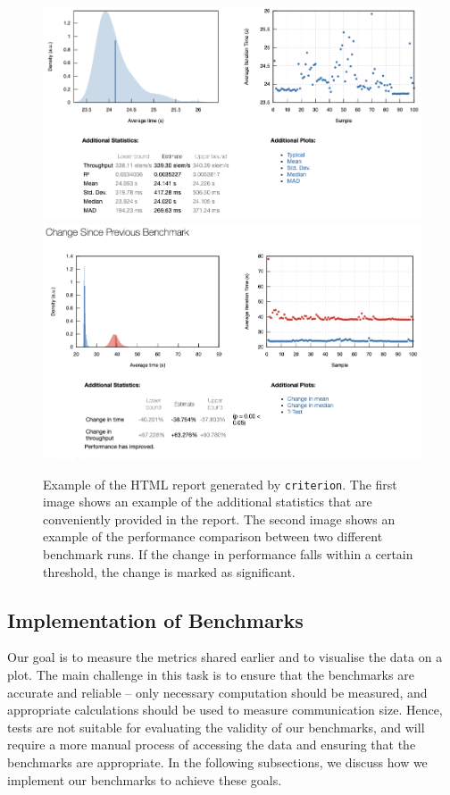 \begin{figure}
  \centering
  \includegraphics[width=0.9\linewidth]{../assets/html-report-example.png}
  \includegraphics[width=0.9\linewidth]{../assets/performance-change-examplel.png}
  \caption{Example of the HTML report generated by \texttt{criterion}.
  The first image shows an example of the additional statistics that are 
  conveniently provided in the report. The second image shows an example of 
  the performance comparison between two different benchmark runs. If the 
  change in performance falls within a certain threshold, the change is marked as 
  significant.
  }
  \label{fig:criterion-report}
\end{figure}

\subsection{Implementation of Benchmarks}
\label{sec:benchmarks-implementation}
Our goal is to measure the metrics shared earlier and to visualise the data on 
a plot. The main challenge in this task is to ensure that the benchmarks are 
accurate and reliable -- only necessary computation should be measured, and 
appropriate calculations should be used to measure communication size. Hence, 
tests are not suitable for evaluating the validity of our benchmarks, and 
will require a more manual process of accessing the data and ensuring that
the benchmarks are appropriate. In the following subsections, we discuss how 
we implement our benchmarks to achieve these goals. 

